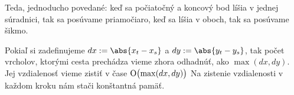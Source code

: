 Teda, jednoducho povedané: keď sa počiatočný a koncový bod líšia v jednej súradnici, tak sa posúvame priamočiaro,
keď sa líšia v oboch, tak sa posúvame šikmo.

Pokiaľ si zadefinujeme $dx := \abs{x_t - x_s}$ a $dy := \abs{y_t - y_s}$, tak počet vrcholov,
ktorými cesta prechádza vieme zhora odhadnúť, ako $\max(dx, dy)$. Jej vzdialenosť vieme zistiť v čase  $\operatorname{O}\bigl(\max(dx, dy)\bigr)$
Na zistenie vzdialenosti v každom kroku nám stači konštantná pamäť.
